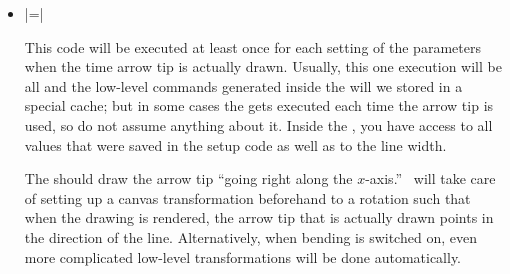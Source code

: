 \begin{command}{\pgfdeclarearrow{}}
\begin{itemize}
    \begin{command}{\pgfarrowssave{}}
      As explained earlier, the setup code needs to ``communicate''
      with the drawing code via ``saved values.'' This command get the
      name of a macro and will store the value this macro had
      internally. Then, each time drawing code is executed, the value
      of this macro will be restored.
    \end{command}

    \begin{command}{\pgfarrowssavethe{}}
      Works like |\pgfarrowssave|, only the parameter must be a
      register and |\the| will be saved.
      Typically, you will write something like
\begin{codeexample}
\pgfarrowssavethe{\pgfarrowlength}
\pgfarrowssavethe{\pgfarrowwidth}
\end{codeexample}
      To ensure that inside the drawing code the the dimension
      registers |\pgfarrowlength| and |\pgfarrowwidth| are setup with
      the values they had during the setup.
    \end{command}
    
  \item {}|=|

    This code will be executed at least once for each setting of the
    parameters when the time arrow tip is actually drawn. Usually,
    this one execution will be all and the 
    low-level commands generated inside the  will we stored
    in a special cache; but in some cases the  gets
    executed each time the arrow tip is used, so do not assume
    anything about it. Inside the , you have access to all
    values that were saved in the setup code as well as to the line
    width.
    
    The  should draw the arrow tip ``going right along the
    $x$-axis.'' \pgfname\ will take care of setting up a  canvas
    transformation beforehand to a rotation such that when the
    drawing is rendered, the arrow tip that is  actually drawn points
    in the direction of the line. Alternatively, when bending is
    switched on, even more complicated low-level transformations will
    be done automatically.
    

\end{itemize}
\end{command}

